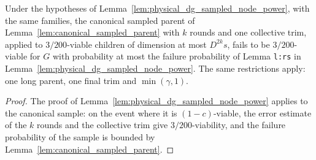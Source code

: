 \begin{lemma}
    \label{lem:physical_dg_canonical_node_failure}
    \leanok
    Under the hypotheses of Lemma~\ref{lem:physical_dg_sampled_node_power},
    with the same families, the canonical sampled parent of
    Lemma~\ref{lem:canonical_sampled_parent} with $k$ rounds and one
    collective trim, applied to $3/200$-viable children of dimension at most
    $D^{2k}s$, fails to be $3/200$-viable for $G$ with probability at most the
    failure probability of Lemma \texttt{l:rs} in
    Lemma~\ref{lem:physical_dg_sampled_node_power}. The same restrictions
    apply: one long parent, one final trim and $\min(\gamma,1)$.
\end{lemma}
\begin{proof}\leanok
    The proof of Lemma~\ref{lem:physical_dg_sampled_node_power} applies to the
    canonical sample: on the event where it is $(1-c)$-viable, the error
    estimate of the $k$ rounds and the collective trim give
    $3/200$-viability, and the failure probability of the sample is bounded
    by Lemma~\ref{lem:canonical_sampled_parent}.
\end{proof}

